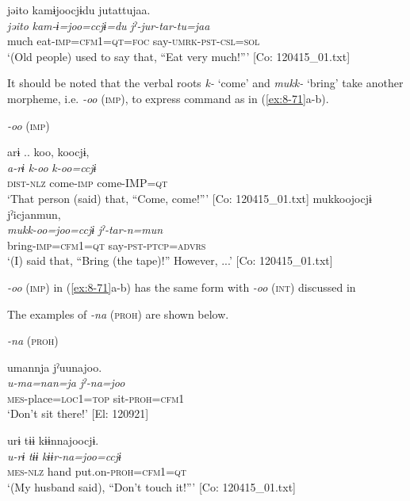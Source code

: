 \ex
{\TM}
\glll  jəito  kamɨjoocjɨdu  jutattujaa.\\
\textit{jəito}  \textit{kam-ɨ=joo=ccjɨ=du}  \textit{jˀ-jur-tar-tu=jaa}\\
much  eat-\textsc{imp}=\textsc{cfm1}=\textsc{qt}=\textsc{foc}  say-\textsc{umrk}-\textsc{pst}-\textsc{csl}=\textsc{sol}\\
\glt ‘(Old people) used to say that, “Eat very much!”’ [Co: 120415\_01.txt]
\z
\z

It should be noted that the verbal roots \textit{k-} ‘come’ and \textit{mukk-} ‘bring’ take another morpheme, i.e. \textit{-oo} (\textsc{imp}), to express command as in (\ref{ex:8-71}a-b).

\ea\label{ex:8-71}
  \textit{-oo} (\textsc{imp})

\ea
{\TM}
\glll  arɨ ..  koo,  koocjɨ,\\
\textit{a-rɨ}  \textit{k-oo}  \textit{k-oo=ccjɨ}\\
\textsc{dist}-\textsc{nlz}  come-\textsc{imp}  come-IMP=\textsc{qt}\\
\glt ‘That person (said) that, “Come, come!”’ [Co: 120415\_01.txt]
\ex
{\TM}
\glll  mukkoojocjɨ  jˀicjanmun,\\
\textit{mukk-oo=joo=ccjɨ}  \textit{jˀ-tar-n=mun}\\
bring-\textsc{imp}=\textsc{cfm1}=\textsc{qt}  say-\textsc{pst}-\textsc{ptcp}=\textsc{advrs}\\
\glt ‘(I) said that, “Bring (the tape)!” However, ...’ [Co: 120415\_01.txt]
\z
\z

\textit{-oo} (\textsc{imp}) in (\ref{ex:8-71}a-b) has the same form with \textit{-oo} (\textsc{int}) discussed in 

  The examples of \textit{-na} (\textsc{proh}) are shown below.

\ea\label{ex:8-72}
  \textit{-na} (\textsc{proh})

\ea
{\TM}
\glll  umannja  jˀuunajoo.\\
\textit{u-ma=nan=ja}  \textit{jˀ-na=joo}\\
\textsc{mes}-place=\textsc{loc}1=\textsc{top}  sit-\textsc{proh}=\textsc{cfm1}\\
\glt ‘Don’t sit there!’ [El: 120921]

\ex
{\TM}
\glll  urɨ  tɨɨ  kɨɨnnajoocjɨ.\\
\textit{u-rɨ}  \textit{tɨɨ}  \textit{kɨɨr-na=joo=ccjɨ}\\
\textsc{mes}-\textsc{nlz}  hand  put.on-\textsc{proh}=\textsc{cfm1}=\textsc{qt}\\
\glt ‘(My husband said), “Don’t touch it!”’ [Co: 120415\_01.txt]
\z
\z

